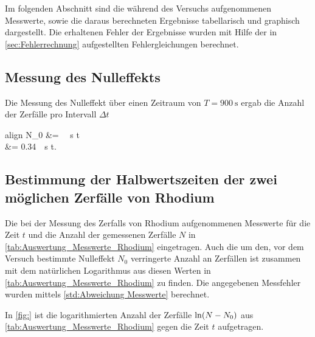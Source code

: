 Im folgenden Abschnitt sind die während des Versuchs aufgenommenen Messwerte,
sowie die daraus berechneten Ergebnisse tabellarisch und graphisch dargestellt.
Die erhaltenen Fehler der Ergebnisse wurden mit Hilfe der in \cref{sec:Fehlerrechnung}
aufgestellten Fehlergleichungen berechnet.


\subsection{Messung des Nulleffekts}

	Die Messung des Nulleffekt über einen Zeitraum von $T = \SI{900}{\second}$ 
	ergab die Anzahl der Zerfälle pro Intervall $\Delta t$ 
	\begin{empheq}{align}
		\notag
		N_{0} &= \ \si{\per\second} \cdot \Delta t\\    
		&= \SI{0.34}{\per\second}  \cdot \Delta t. 
	\end{empheq} 

\subsection{Bestimmung der Halbwertszeiten der zwei möglichen Zerfälle von Rhodium}
	
	Die bei der Messung des Zerfalls von Rhodium aufgenommenen Messwerte
	für die Zeit $t$ und die Anzahl der gemessenen Zerfälle $N$ in \cref{tab:Auswertung_Messwerte_Rhodium}
	eingetragen. Auch die um den, vor dem Versuch bestimmte Nulleffekt $N_{0}$
    verringerte Anzahl an Zerfällen ist zusammen mit dem natürlichen Logarithmus
    aus diesen Werten in \cref{tab:Auswertung_Messwerte_Rhodium} zu finden.
    Die angegebenen Messfehler wurden mittels \cref{std:Abweichung Messwerte} berechnet.
    
   	 
   	
   	In \cref{fig:} ist die logarithmierten Anzahl der Zerfälle $\Ln{N - N_{0}}$ aus \cref{tab:Auswertung_Messwerte_Rhodium} gegen die Zeit $t$ aufgetragen.  
   	
     
